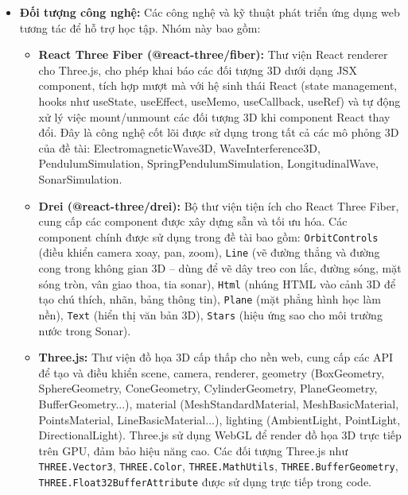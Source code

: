 \begin{itemize}
\begin{itemize}
\begin{itemize}
            \item Giao thoa sóng: nguyên lý chồng chất sóng $u = u_1 + u_2$, điều kiện cực đại $d_2 - d_1 = k\lambda$, điều kiện cực tiểu $d_2 - d_1 = (k+\frac{1}{2})\lambda$, hình dạng các vân giao thoa hyperbol.
            \item Sóng dừng: điều kiện $L = n\lambda/2$ (hai đầu cố định), vị trí bụng và nút sóng, phương trình $u = 2A\cos(kx)\sin(\omega t)$.
            \item Sóng điện từ: phương trình $E = E_0\cos(\omega t - kx)$, $B = B_0\cos(\omega t - kx)$, mối quan hệ $E_0 = cB_0$, tính chất sóng ngang ($\vec{E} \perp \vec{B} \perp \vec{v}$).
        \end{itemize}
    \end{itemize}
    
    \item \textbf{Đối tượng công nghệ:} Các công nghệ và kỹ thuật phát triển ứng dụng web tương tác để hỗ trợ học tập. Nhóm này bao gồm:
    \begin{itemize}
        \item \textbf{React Three Fiber (@react-three/fiber):} Thư viện React renderer cho Three.js, cho phép khai báo các đối tượng 3D dưới dạng JSX component, tích hợp mượt mà với hệ sinh thái React (state management, hooks như useState, useEffect, useMemo, useCallback, useRef) và tự động xử lý việc mount/unmount các đối tượng 3D khi component React thay đổi. Đây là công nghệ cốt lõi được sử dụng trong tất cả các mô phỏng 3D của đề tài: ElectromagneticWave3D, WaveInterference3D, PendulumSimulation, SpringPendulumSimulation, LongitudinalWave, SonarSimulation.
        \item \textbf{Drei (@react-three/drei):} Bộ thư viện tiện ích cho React Three Fiber, cung cấp các component được xây dựng sẵn và tối ưu hóa. Các component chính được sử dụng trong đề tài bao gồm: \texttt{OrbitControls} (điều khiển camera xoay, pan, zoom), \texttt{Line} (vẽ đường thẳng và đường cong trong không gian 3D – dùng để vẽ dây treo con lắc, đường sóng, mặt sóng tròn, vân giao thoa, tia sonar), \texttt{Html} (nhúng HTML vào cảnh 3D để tạo chú thích, nhãn, bảng thông tin), \texttt{Plane} (mặt phẳng hình học làm nền), \texttt{Text} (hiển thị văn bản 3D), \texttt{Stars} (hiệu ứng sao cho môi trường nước trong Sonar).
        \item \textbf{Three.js:} Thư viện đồ họa 3D cấp thấp cho nền web, cung cấp các API để tạo và điều khiển scene, camera, renderer, geometry (BoxGeometry, SphereGeometry, ConeGeometry, CylinderGeometry, PlaneGeometry, BufferGeometry...), material (MeshStandardMaterial, MeshBasicMaterial, PointsMaterial, LineBasicMaterial...), lighting (AmbientLight, PointLight, DirectionalLight). Three.js sử dụng WebGL để render đồ họa 3D trực tiếp trên GPU, đảm bảo hiệu năng cao. Các đối tượng Three.js như \texttt{THREE.Vector3}, \texttt{THREE.Color}, \texttt{THREE.MathUtils}, \texttt{THREE.BufferGeometry}, \texttt{THREE.Float32BufferAttribute} được sử dụng trực tiếp trong code.

\end{itemize}
\end{itemize}
